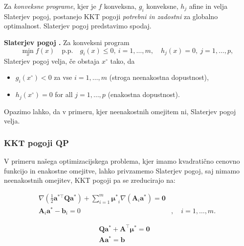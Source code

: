 \documentclass[mat2, tisk]{fmfdelo}
\begin{document}
Za \emph{konveksne programe}, kjer je $f$ konveksna, $g_i$ konveksne, $h_j$ afine in velja Slaterjev pogoj, postanejo KKT pogoji \emph{potrebni in zadostni} za globalno optimalnost. Slaterjev pogoj predstavimo spodaj.

\textbf{Slaterjev pogoj \cite{bertsekas1997nonlinear,boyd2004convex}.} 
Za konveksni program
\[
\min_x f(x) \quad \text{p.p.} \quad g_i(x) \leq 0, \ i=1,\dots,m, \quad h_j(x) = 0, \ j=1,\dots,p,
\]
Slaterjev pogoj velja, če obstaja $x^\circ$ tako, da
\begin{itemize}
\item $g_i(x^\circ) < 0$ za vse $i=1,\dots,m$ (stroga neenakostna dopustnost),
\item $h_j(x^\circ) = 0$ for all $j=1,\dots,p$ (enakostna dopustnost).
\end{itemize}

Opazimo lahko, da v primeru, kjer neenakostnih omejitem ni, Slaterjev pogoj velja.

\subsubsection{KKT pogoji QP}

V primeru našega optimizacijskega problema, kjer imamo kvadratično cenovno funkcijo in enakostne omejitve, lahko privzamemo Slaterjev pogoj, saj nimamo neenakostnih omejitev, KKT pogoji pa se zreducirajo na:

\begin{equation}
    \begin{aligned}
        \nabla (\frac{1}{2}\mathbf{a^{*\top}}\mathbf{Q}\mathbf{a^*}) + \sum_{i=1}^m \mathbf{\mu^*}_i \nabla(\mathbf{A}_i \mathbf{a^*}) = \mathbf{0}& \\
        \mathbf{A}_i \mathbf{a^*} - \mathbf{b}_i = 0&, \quad i = 1,\ldots, m.
    \end{aligned}
\end{equation}

\begin{equation}
    \begin{aligned}
        \mathbf{Q}\mathbf{a^*} + \mathbf{A^\top}\mathbf{\mu^*} = \mathbf{0}& \\
        \mathbf{A} \mathbf{a^*} = \mathbf{b}&
    \end{aligned}
\end{equation}
\end{document}
